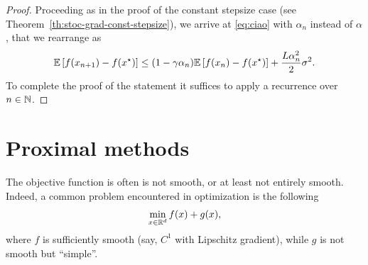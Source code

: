  
     \begin{proof}
         Proceeding as in the proof of the constant stepsize case (see Theorem~\ref{th:stoc-grad-const-stepsize}), we arrive at \eqref{eq:ciao} with $\alpha_n$ instead of $\alpha$, that we rearrange as
         \begin{equation}
             \mathbb{E}\left[ f(x_{n+1}) -f(x^\star)\right] \le (1-\gamma\alpha_n)  \mathbb{E}\left[f(x_{n}) -f(x^\star)\right]	+\frac{L\alpha_n^2}{2} \sigma^2 .
         \end{equation}
         To complete the proof of the statement it suffices to apply a recurrence over $n\in\mathbb{N}$.
     \end{proof}
 
     \section{Proximal methods}
 
     The objective function is often is not smooth, or at least not entirely smooth.
     Indeed, a common problem encountered in optimization is the following
     \begin{equation}
         \label{eq:f+g-prox}
         \min_{x\in\mathbb{R}^d} f(x) + g(x),
     \end{equation}
     where $f$ is sufficiently smooth (say, $C^1$ with Lipschitz gradient), while $g$ is not smooth but ``simple''.
 
